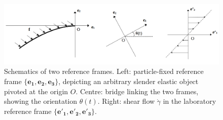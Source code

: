 \documentclass[12pt,MSc,twoside]{muthesis_2020}
\begin{document}
\begin{figure}[htb]
	\begin{center}
		\includegraphics[width=1\textwidth]{plot/frames_general.png}
		\caption{Schematics of two reference frames. Left: particle-fixed reference frame $\{\mathbf{e_1},\mathbf{e_2},\mathbf{e_3}\}$, depicting an arbitrary slender elastic object pivoted at the origin $O$. Centre: bridge linking the two frames, showing the orientation $\theta(t)$. Right: shear flow $\dot{\gamma}$ in the laboratory reference frame $\{\mathbf{e'_1},\mathbf{e'_2},\mathbf{e'_3}\}$.}
    \label{fig:3}
	\end{center}
\end{figure}
\end{document}
